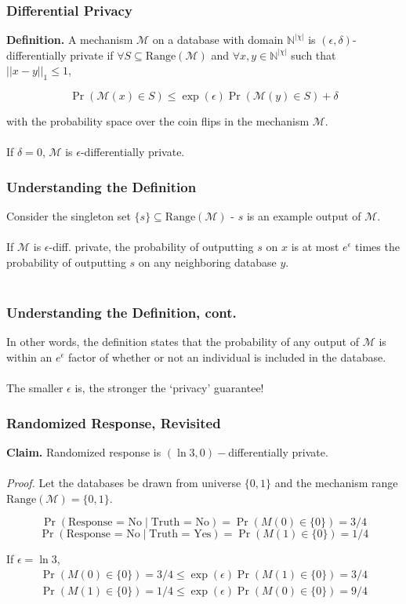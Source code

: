 \documentclass[aspectratio=169]{beamer}
\newcommand{\emm}{\mathcal{M}}
\newcommand{\dbd}{\mathbb{N}^{|\chi|}}
\begin{document}
\begin{frame}
\frametitle{Differential Privacy}

\textbf{Definition.} A mechanism $\emm$ on a database with domain $\dbd$ is $(\epsilon, \delta)$-differentially private if $\forall S \subseteq \text{Range}(\emm)$ and $\forall x,y \in \dbd$ such that $||x-y||_1 \leq 1$,

$$\Pr(\emm(x) \in S) \leq \exp(\epsilon) \Pr(\emm(y) \in S) + \delta$$

with the probability space over the coin flips in the mechanism $\emm$.\\~\\

If $\delta = 0$, $\emm$ is $\epsilon$-differentially private.
\end{frame}

\begin{frame}
\frametitle{Understanding the Definition}

Consider the singleton set $\{s\} \subseteq \text{Range}(\emm)$ - $s$ is an example output of $\emm$.\\~\\

If $\emm$ is $\epsilon$-diff. private, the probability of outputting $s$ on $x$ is at most $e^{\epsilon}$ times the probability of outputting $s$ on any neighboring database $y$.\\~\\
\end{frame}

\begin{frame}
\frametitle{Understanding the Definition, cont.}
In other words, the definition states that the probability of any output of $\emm$ is within an $e^{\epsilon}$ factor of whether or not an individual is included in the database.\\~\\

The smaller $\epsilon$ is, the stronger the `privacy' guarantee!
\end{frame}

\begin{frame}
\frametitle{Randomized Response, Revisited}
\textbf{Claim.} Randomized response is $(\ln 3, 0)-$differentially private.\\~\\

\textit{Proof.} Let the databases be drawn from universe $\{0, 1\}$ and the mechanism range $\text{Range}(\emm) = \{0, 1\}$.

$$\Pr(\text{Response = No} \mid \text{Truth = No}) = \Pr(M(0) \in \{0\}) = 3/4$$
$$\Pr(\text{Response = No} \mid \text{Truth = Yes}) = \Pr(M(1) \in \{0\}) = 1/4$$

If $\epsilon = \ln 3$, 
\begin{align*}
  \Pr(M(0) \in \{0\}) = 3/4 \leq \exp(\epsilon) \Pr(M(1) \in \{0\}) = 3/4\\
  \Pr(M(1) \in \{0\}) = 1/4 \leq \exp(\epsilon) \Pr(M(0) \in \{0\}) = 9/4\\
\end{align*}
\end{frame}
\end{document}
